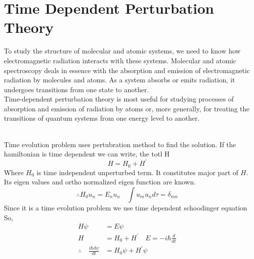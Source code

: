 \section{Time Dependent Perturbation Theory}
To study the structure of molecular and atomic systems, we need to know how electromagnetic radiation interacts with these systems. Molecular and atomic spectroscopy deals in essence with the absorption and emission of electromagnetic radiation by molecules and atoms. As a system absorbs or emits radiation, it undergoes transitions from one state to another.\\
Time-dependent perturbation theory is most useful for studying processes of absorption and emission of radiation by atoms or, more generally, for treating the transitions of quantum systems from one energy level to another.\\\\
\par Time evolution problem uses pertubration method to find the solution. If the hamiltonian is time dependent we can write, the totl H
$$H=H_0+H^\prime$$
Where $H_0$ is time independent unperturbed term. It constitutes major part of $H$.
Its eigen values and ortho normalized eigen function are known.
$$\therefore H_0u_n=E_n u_n\quad \int u_m u_n d\tau=\delta_{mn}$$
Since it is a time evolution problem we use time dependent schoodinger equation \\
So,
	$$
	\begin{aligned}
	H\psi&=E\psi\\
	H&=H_0+H^\prime\quad E=-i\hbar\frac{ d}{dt}\\
	\therefore\quad \frac{i\hbar d \psi}{dt}&=H_0\psi+H^\prime\psi
\end{aligned}
$$





